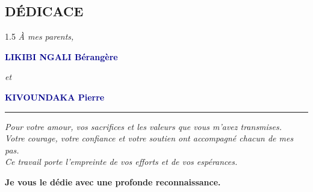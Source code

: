 \documentclass[12pt,twoside]{report}
\begin{document}
\begin{singlespace}

\chapter*{DÉDICACE}
\vspace*{0.04\textheight}
\noindent\hfill
\begin{minipage}{0.55\textwidth}
\raggedleft
\begin{spacing}{1.5}
{\Large\itshape À mes parents,}\par
\vspace{0.7cm}
{\Large\bfseries\textcolor{darkblue}{LIKIBI NGALI Bérangère}}\par
\vspace{0.15cm}
{\large\itshape et}\par
\vspace{0.15cm}
{\Large\bfseries\textcolor{darkblue}{KIVOUNDAKA Pierre}}\par
\vspace{1cm}
\rule{0.34\textwidth}{0.6pt}\par
\vspace{0.8cm}
{\itshape
Pour votre amour, vos sacrifices et les valeurs que vous m'avez transmises.\\
Votre courage, votre confiance et votre soutien ont accompagné chacun de mes pas.\\
Ce travail porte l'empreinte de vos efforts et de vos espérances.}
\par\vspace{1cm}
{\large\bfseries Je vous le dédie avec une profonde reconnaissance.}
\end{spacing}
\end{minipage}



\end{singlespace}
\end{document}
